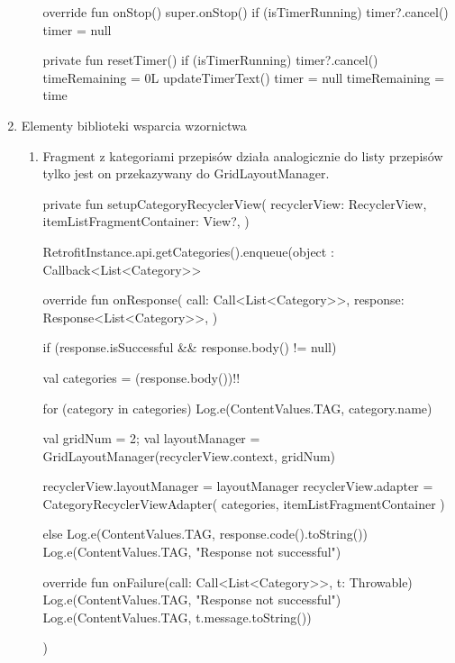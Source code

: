 \documentclass{article}
\begin{document}
\begin{enumerate}
\begin{enumerate}
\begin{mylisting}
override fun onStop() {
    super.onStop()
    if (isTimerRunning) {
        timer?.cancel()
        timer = null
    }
}

private fun resetTimer() {
    if (isTimerRunning) {
        timer?.cancel()
        timeRemaining = 0L
        updateTimerText()
        timer = null
        timeRemaining = time
    }
}
\end{mylisting}
\end{enumerate}

\newpage

\item Elementy biblioteki wsparcia wzornictwa
\begin{enumerate}
    \item Fragment z kategoriami przepisów działa analogicznie do listy przepisów
     tylko jest on 
    przekazywany do GridLayoutManager.
\begin{mylisting}
private fun setupCategoryRecyclerView(
    recyclerView: RecyclerView,
    itemListFragmentContainer: View?,
) {
    RetrofitInstance.api.getCategories().enqueue(object : Callback<List<Category>> {
        override fun onResponse(
            call: Call<List<Category>>,
            response: Response<List<Category>>,
        ) {
            if (response.isSuccessful && response.body() != null) {
                val categories = (response.body())!!

                for (category in categories) {
                    Log.e(ContentValues.TAG, category.name)
                }

                val gridNum = 2;
                val layoutManager = GridLayoutManager(recyclerView.context, gridNum)

                recyclerView.layoutManager = layoutManager
                recyclerView.adapter = CategoryRecyclerViewAdapter(
                    categories, itemListFragmentContainer
                )
            } else {
                Log.e(ContentValues.TAG, response.code().toString())
                Log.e(ContentValues.TAG, "Response not successful")
            }
        }

        override fun onFailure(call: Call<List<Category>>, t: Throwable) {
            Log.e(ContentValues.TAG, "Response not successful")
            Log.e(ContentValues.TAG, t.message.toString())
        }
    })
}
\end{mylisting}

    \end{enumerate}

\newpage


\end{enumerate}
\end{document}
